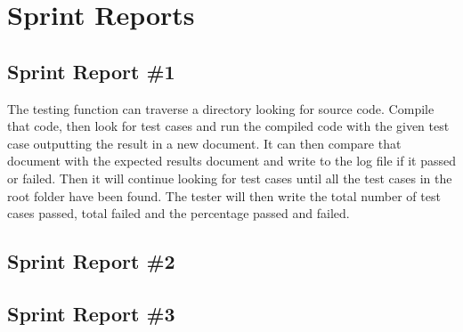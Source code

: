 
\chapter{Sprint Reports}

\section{Sprint Report \#1}
The testing function can traverse a directory looking for source code. Compile that code, then
look for test cases and run the compiled code with the given test case outputting the result in a 
new document. It can then compare that document with the expected results document and write
to the log file if it passed or failed. Then it will continue looking for test cases until all the test cases
in the root folder have been found. The tester will then write the total number of test cases passed,
total failed and the percentage passed and failed.

\section{Sprint Report \#2}

\section{Sprint Report \#3}
